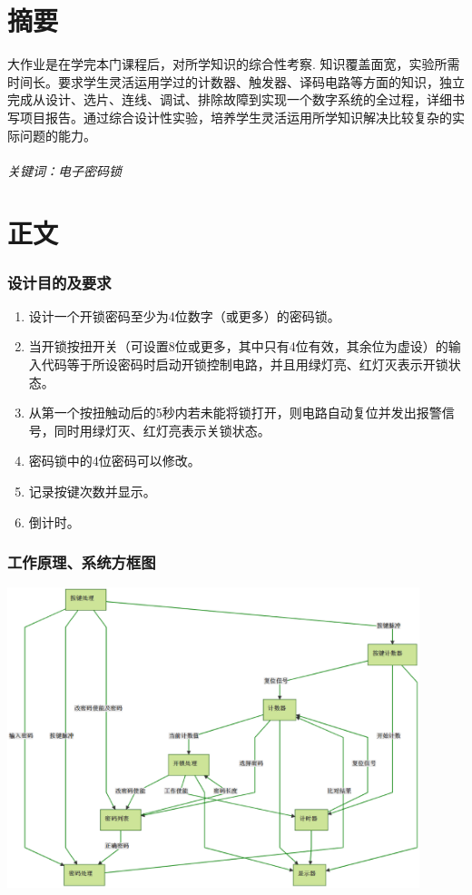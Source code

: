 \documentclass[a4paper,11pt]{ctexart}
\begin{document}
\part*{摘要}大作业是在学完本门课程后，对所学知识的综合性考察. 知识覆盖面宽，实验所需时间长。要求学生灵活运用学过的计数器、触发器、译码电路等方面的知识，独立完成从设计、选片、连线、调试、排除故障到实现一个数字系统的全过程，详细书写项目报告。通过综合设计性实验，培养学生灵活运用所学知识解决比较复杂的实际问题的能力。
\paragraph{关键词：电子密码锁}

\tableofcontents            %
\newpage

\part{正文}
\section{设计目的及要求}
\begin{enumerate}
\item 设计一个开锁密码至少为4位数字（或更多）的密码锁。
\item 当开锁按扭开关（可设置8位或更多，其中只有4位有效，其余位为虚设）的输入代码等于所设密码时启动开锁控制电路，并且用绿灯亮、红灯灭表示开锁状态。
\item 从第一个按扭触动后的5秒内若未能将锁打开，则电路自动复位并发出报警信号，同时用绿灯灭、红灯亮表示关锁状态。
\item 密码锁中的4位密码可以修改。
\item 记录按键次数并显示。
\item 倒计时。
\end{enumerate}

\section{工作原理、系统方框图}
\begin{center}
\includegraphics[width=0.9\textwidth]{./images/struct.eps}
\end{center}
\end{document}
